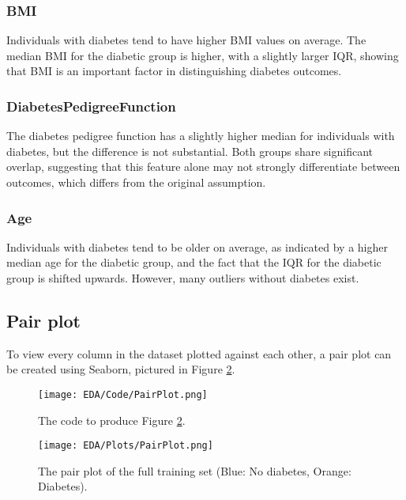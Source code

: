 \subsubsection{BMI}
Individuals with diabetes tend to have higher BMI values on average.
The median BMI for the diabetic group is higher, with a slightly larger IQR, showing that BMI is an important factor in distinguishing diabetes outcomes.

\subsubsection{DiabetesPedigreeFunction}
The diabetes pedigree function has a slightly higher median for individuals with diabetes, but the difference is not substantial.
Both groups share significant overlap, suggesting that this feature alone may not strongly differentiate between outcomes, which 
differs from the original assumption.

\subsubsection{Age}
Individuals with diabetes tend to be older on average, as indicated by a higher median age for the diabetic group, and the fact that 
the IQR for the diabetic group is shifted upwards. However, many outliers without diabetes exist.

\subsection{Pair plot}
To view every column in the dataset plotted against each other, a pair plot can be created using Seaborn,
pictured in Figure \ref{fig:PairPlot}.

\begin{figure}[H]
    \centering
    \texttt{[image: EDA/Code/PairPlot.png]}
    \caption{The code to produce Figure \ref{fig:PairPlot}.}
    \label{fig:PairPlotCode}
\end{figure}

\begin{figure}[H]
    \centering
    \texttt{[image: EDA/Plots/PairPlot.png]}
    \caption{The pair plot of the full training set (Blue: No diabetes, Orange: Diabetes).}
    \label{fig:PairPlot}
\end{figure}


